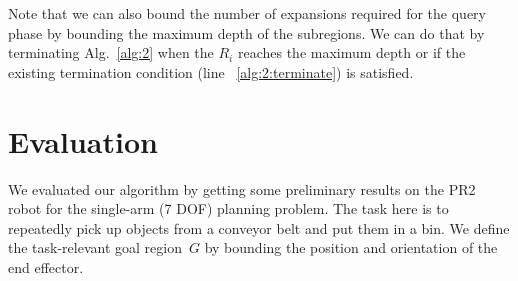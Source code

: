 \documentclass[letterpaper]{article} %
\begin{document}
%
Note that we can also bound the number of expansions required for the query phase by bounding the maximum depth of the subregions. We can do that by terminating Alg.~\ref{alg:2} when the $R_i$ reaches the maximum depth or if the existing termination condition (line ~\ref{alg:2:terminate}) is satisfied.

\section{Evaluation}
\begin{table}[tb]
    \caption{Experimental results comparing our method with \textsf{PRM}. The table shows the mean/worst-case planning times and success rates for our method and for \textsf{PRM} preprocessed with equal, double and quadruple the time that our method takes in precomputation (T = 984 seconds).}
    \label{tab:stats}
 \vspace{-6mm}
\end{table}

We evaluated our algorithm by getting some preliminary results on the PR2 robot for the single-arm (7 DOF) planning problem. The task here is to repeatedly pick up objects from a conveyor belt and put them in a bin. 
We define the task-relevant goal region~$G$ by bounding the position and orientation of the end effector. 

\end{document}
